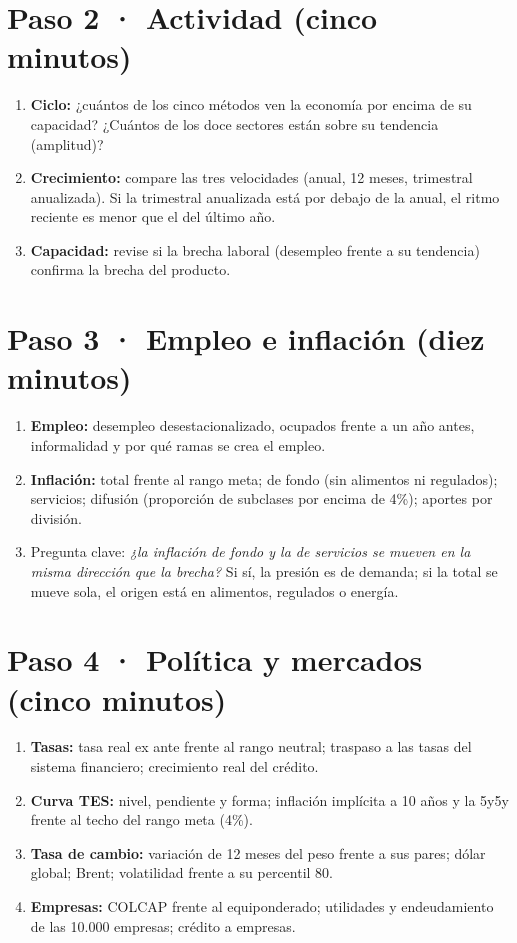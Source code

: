 \section{Paso 2 · Actividad (cinco minutos)}
\begin{enumerate}
\item \textbf{Ciclo:} ¿cuántos de los cinco métodos ven la economía por encima de su capacidad? ¿Cuántos de los doce
  sectores están sobre su tendencia (amplitud)?
\item \textbf{Crecimiento:} compare las tres velocidades (anual, 12 meses, trimestral anualizada). Si la trimestral
  anualizada está por debajo de la anual, el ritmo reciente es menor que el del último año.
\item \textbf{Capacidad:} revise si la brecha laboral (desempleo frente a su tendencia) confirma la brecha del
  producto.
\end{enumerate}

\section{Paso 3 · Empleo e inflación (diez minutos)}
\begin{enumerate}
\item \textbf{Empleo:} desempleo desestacionalizado, ocupados frente a un año antes, informalidad y por qué ramas se
  crea el empleo.
\item \textbf{Inflación:} total frente al rango meta; de fondo (sin alimentos ni regulados); servicios; difusión
  (proporción de subclases por encima de 4\%); aportes por división.
\item Pregunta clave: \emph{¿la inflación de fondo y la de servicios se mueven en la misma dirección que la
  brecha?} Si sí, la presión es de demanda; si la total se mueve sola, el origen está en alimentos, regulados o
  energía.
\end{enumerate}

\section{Paso 4 · Política y mercados (cinco minutos)}
\begin{enumerate}
\item \textbf{Tasas:} tasa real ex ante frente al rango neutral; traspaso a las tasas del sistema financiero;
  crecimiento real del crédito.
\item \textbf{Curva TES:} nivel, pendiente y forma; inflación implícita a 10 años y la 5y5y frente al techo del
  rango meta (4\%).
\item \textbf{Tasa de cambio:} variación de 12 meses del peso frente a sus pares; dólar global; Brent; volatilidad
  frente a su percentil 80.
\item \textbf{Empresas:} COLCAP frente al equiponderado; utilidades y endeudamiento de las 10.000 empresas; crédito
  a empresas.
\end{enumerate}

